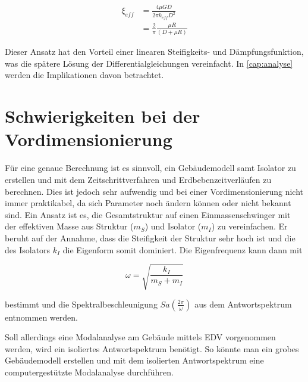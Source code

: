 \begin{align}
\xi_{eff} &= \frac{4 \mu G D}{2 \pi k_{eff} D^2}\nonumber\\
          &= \frac{2}{\pi} \frac{\mu R}{(D + \mu R)}\label{xieff}
\end{align}

Dieser Ansatz hat den Vorteil einer linearen Steifigkeits- und Dämpfungsfunktion, was die spätere Lösung der Differentialgleichungen vereinfacht. In \cref{cap:analyse} werden die Implikationen davon betrachtet.

\pagebreak

\section{Schwierigkeiten bei der Vordimensionierung}
\label{sec:schwierigkeitenvordimensionierung}

Für eine genaue Berechnung ist es sinnvoll, ein Gebäudemodell samt Isolator zu erstellen und mit dem Zeitschrittverfahren und Erdbebenzeitverläufen zu berechnen. Dies ist jedoch sehr aufwendig und bei einer Vordimensionierung nicht immer praktikabel, da sich Parameter noch ändern können oder nicht bekannt sind.
Ein Ansatz ist es, die Gesamtstruktur auf einen Einmassenschwinger mit der effektiven Masse aus Struktur ($m_S$) und Isolator ($m_I$) zu vereinfachen. Er beruht auf der Annahme, dass die Steifigkeit der Struktur sehr hoch ist und die des Isolators $k_I$ die Eigenform somit dominiert. \cite{Kelly2}
Die Eigenfrequenz kann dann mit

\begin{equation}
\omega = \sqrt{\frac{k_I}{m_S + m_I}}
\end{equation}

bestimmt und die Spektralbeschleunigung $Sa(\frac{2 \pi}{\omega})$ aus dem Antwortspektrum entnommen werden.

Soll allerdings eine Modalanalyse am Gebäude mittels EDV vorgenommen werden, wird ein isoliertes Antwortspektrum benötigt.
So könnte man ein grobes Gebäudemodell erstellen und mit dem isolierten Antwortspektrum eine computergestützte Modalanalyse durchführen.

\pagebreak
